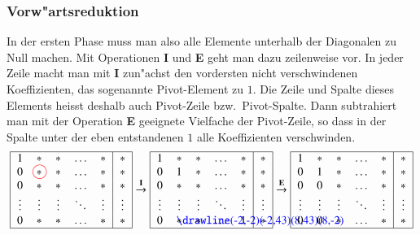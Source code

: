 \subsubsection{Vorw"artsreduktion}
In der ersten Phase muss man also alle Elemente unterhalb der
Diagonalen zu Null machen. Mit Operationen {\bf I} und {\bf E}
geht man dazu zeilenweise vor.
In jeder Zeile macht man mit {\bf I}
zun"achst den vordersten nicht verschwindenen Koeffizienten, das sogenannte
Pivot-Element zu $1$.
Die Zeile und Spalte dieses Elements heisst deshalb
auch Pivot-Zeile bzw.~Pivot-Spalte.
Dann subtrahiert man mit der Operation {\bf E} geeignete Vielfache
der Pivot-Zeile, so dass in der Spalte
unter der eben entstandenen $1$ alle Koeffizienten verschwinden.
\begin{gather*}
\begin{tabular}{|>{$}c<{$}>{$}c<{$}>{$}c<{$}>{$}c<{$}>{$}c<{$}|>{$}c<{$}|}
\hline
1&*&*&\dots&*&*\\
0&\begin{picture}(0,0)
\color{red}\put(2.8,3.05){\circle{12}}
\end{picture}%
*&*&\dots&*&*\\
0&*&*&\dots&*&*\\
\vdots&\vdots& \vdots& \ddots& \vdots&\vdots\\
0&*&*&\dots&*&*\\
\hline
\end{tabular}
\overset{\text{\bf I}}\rightarrow
\begin{tabular}{|>{$}c<{$}>{$}c<{$}>{$}c<{$}>{$}c<{$}>{$}c<{$}|>{$}c<{$}|}
\hline
1&*&*&\dots&*&*\\
0&1&*&\dots&*&*\\
0&*&*&\dots&*&*\\
\vdots&\vdots& \vdots& \ddots& \vdots&\vdots\\
0&\begin{picture}(0,0)
\color{blue}\drawline(-2,-2)(-2,43)(8,43)(8,-2)
\end{picture}%
*&*&\dots&1&*\\
\hline
\end{tabular}
\overset{\text{\bf E}}\rightarrow
\begin{tabular}{|>{$}c<{$}>{$}c<{$}>{$}c<{$}>{$}c<{$}>{$}c<{$}|>{$}c<{$}|}
\hline
1&*&*&\dots&*&*\\
0&1&*&\dots&*&*\\
0&0&*&\dots&*&*\\
\vdots& \vdots&\vdots& \ddots& \vdots&\vdots\\
0&0&*&\dots&*&*\\
\hline
\end{tabular}
\end{gather*}
